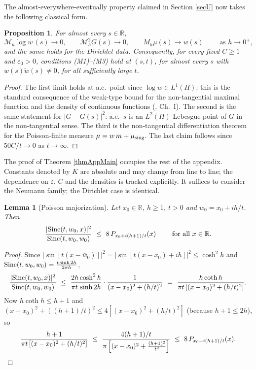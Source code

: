 \documentclass[11pt,twoside,reqno]{amsart}
\def\ti{\tilde}
\def\to{\rightarrow}
\def\R{{\mathbb R}}
\def\MM{{\mathcal M}}
\def\e{\varepsilon}
\def\S{\text{\rm Sinc}}
\theoremstyle{plain}
\newtheorem{lemma}{Lemma}
\newtheorem{proposition}{Proposition}
\numberwithin{equation}{section}
\begin{document}
The almost-everywhere-eventually property claimed in Section \ref{secU} now takes the following classical form.

\begin{proposition}\label{propAae}
For almost every $s\in\R$,
$$\MM_h\log w\,(s)\to0,\qquad \MM^2_hG(s)\to0,\qquad M_h\mu(s)\to w(s)\qquad\text{ as }h\to0^+,$$
and the same holds for the Dirichlet data. Consequently, for every fixed $C\geq1$ and $\e_0>0$, conditions {\rm(M1)--(M3)} hold at $(s,t)$, for almost every $s$ with $w(s)\ti w(s)\neq0$, for all sufficiently large $t$.
\end{proposition}

\begin{proof}
The first limit holds at a.e.\ point since $\log w\in L^1(\Pi)$: this is the standard consequence of the weak-type bound for the non-tangential maximal function and the density of continuous functions (\cite{G}, Ch.~I). The second is the same statement for $|G-G(s)|^2$: a.e.\ $s$ is an $L^2(\Pi)$-Lebesgue point of $G$ in the non-tangential sense. The third is the non-tangential differentiation theorem for the Poisson-finite measure $\mu=w\,m+\mu_{\rm sing}$. The last claim follows since $50C/t\to0$ as $t\to\infty$.
\end{proof}

The proof of Theorem \ref{thmAppMain} occupies the rest of the appendix. Constants denoted by $K$ are absolute and may change from line to line; the dependence on $\e$, $C$ and the densities is tracked explicitly. It suffices to consider the Neumann family; the Dirichlet case is identical.

\begin{lemma}[Poisson majorization]\label{lemAPS}
Let $x_0\in\R$, $h\geq1$, $t>0$ and $w_0=x_0+ih/t$. Then
$$\frac{|\S(t,w_0,x)|^2}{\S(t,w_0,w_0)}\ \leq\ 8\,P_{x_0+i(h+1)/t}(x)\qquad\text{ for all }x\in\R .$$
\end{lemma}

\begin{proof}
Since $|\sin[t(x-\bar w_0)]|^2=|\sin[t(x-x_0)+ih]|^2\leq\cosh^2h$ and $\S(t,w_0,w_0)=\frac{t\sinh2h}{2\pi h}$,
$$\frac{|\S(t,w_0,x)|^2}{\S(t,w_0,w_0)}\ \leq\ \frac{2h\cosh^2h}{\pi t\,\sinh 2h}\cdot\frac1{(x-x_0)^2+(h/t)^2}\ =\ \frac{h\coth h}{\pi t\left[(x-x_0)^2+(h/t)^2\right]} .$$
Now $h\coth h\leq h+1$ and $(x-x_0)^2+((h+1)/t)^2\leq4\left[(x-x_0)^2+(h/t)^2\right]$ (because $h+1\leq2h$), so
$$\frac{h+1}{\pi t\left[(x-x_0)^2+(h/t)^2\right]}\ \leq\ \frac{4(h+1)/t}{\pi \left[(x-x_0)^2+\frac{(h+1)^2}{t^2}\right]}\ \leq\ 8\,P_{x_0+i(h+1)/t}(x). \qedhere$$
\end{proof}
\end{document}
